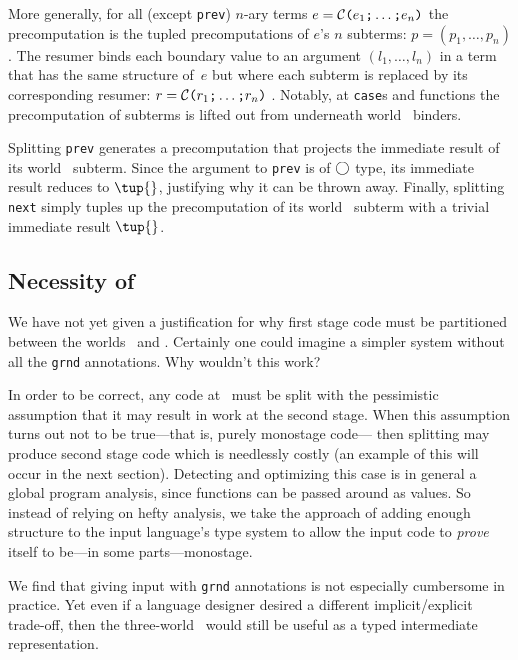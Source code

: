 \begin{abstrsyn}
More generally, for all (except \texttt{prev}) 
$n$-ary terms $e = \mathcal{C}\texttt{(} e_1 \texttt{;} \ldots \texttt{;} e_n \texttt{)}$ 
the precomputation is the tupled precomputations of $e$'s $n$ subterms:
$p=(p_1,\ldots,p_n)$.  The resumer binds each boundary value to an
argument $(l_1,\ldots,l_n)$ in a term that has the same structure
of~$e$ but where each subterm is replaced by its corresponding resumer:
$r = \mathcal{C}\texttt{(} r_1 \texttt{;} \ldots \texttt{;} r_n \texttt{)}$ .
Notably, at \texttt{case}s and functions the
precomputation of subterms is lifted out from underneath world \bbtwo\ binders.  

Splitting \texttt{prev} generates a precomputation that projects the immediate
result of its world \bbone\ subterm.
Since the argument to \texttt{prev} is of $\bigcirc$ type, its immediate result reduces to $\tup{}$, justifying why it can be thrown away.
Finally, splitting \texttt{next} simply tuples up the precomputation of its
world \bbtwo\ subterm with a trivial immediate result $\tup{}$.

\subsection {Necessity of \bbonep}

We have not yet given a justification for why first stage code must be
partitioned between the worlds \bbonem\ and \bbonep.
Certainly one could imagine a simpler system without all the \texttt{grnd} annotations.  
Why wouldn't this work?

In order to be correct, any code at \bbonem\ must be split with the 
pessimistic assumption that it may result in work at the second stage.
When this assumption turns out not to be true---that is, purely monostage code---
then splitting may produce second stage code which is needlessly costly 
(an example of this will occur in the next section).
Detecting and optimizing this case is in general a global program analysis,
since functions can be passed around as values.  
So instead of relying on hefty analysis, 
we take the approach of adding enough structure to the input language's type system to
allow the input code to {\em prove} itself to be---in some parts---monostage.

We find that giving input with \texttt{grnd} annotations is not especially cumbersome in practice.
Yet even if a language designer desired a different implicit/explicit trade-off,
then the three-world \lang\ would still be useful as a typed intermediate representation.

\end{abstrsyn}



